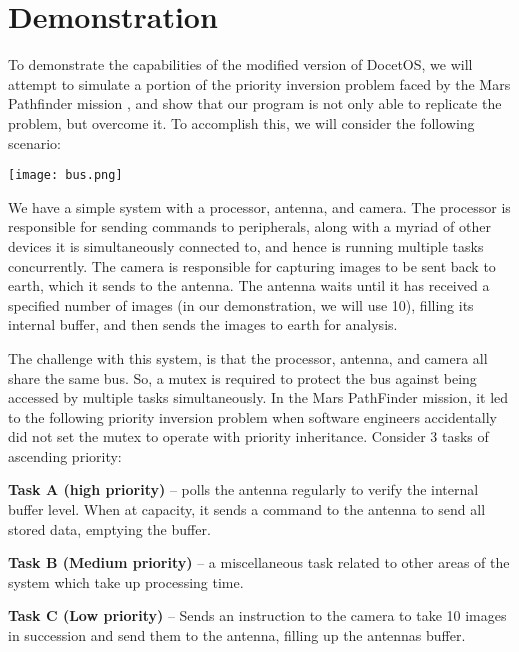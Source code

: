 \section{Demonstration}
To demonstrate the capabilities of the modified version of DocetOS, we will attempt to simulate a portion of the priority inversion problem faced by the Mars Pathfinder mission \cite{MarsPathfinder}, and show that our program is not only able to replicate the problem, but overcome it.\hfill\newline
To accomplish this, we will consider the following scenario:
\begin{center}
	\texttt{[image: bus.png]}
\end{center}
We have a simple system with a processor, antenna, and camera. The processor is responsible for sending commands to peripherals, along with a  myriad of other devices it is simultaneously connected to, and hence is running multiple tasks concurrently. The camera is responsible for capturing images to be sent back to earth, which it sends to the antenna. The antenna waits until it has received a specified number of images (in our demonstration, we will use 10), filling its internal buffer, and then sends the images to earth for analysis.\hfill\newline

The challenge with this system, is that the processor, antenna, and camera all share the same bus. So, a mutex is required to protect the bus against being accessed by multiple tasks simultaneously. In the Mars PathFinder mission, it led to the following priority inversion problem when software engineers accidentally did not set the mutex to operate with priority inheritance. Consider 3 tasks of ascending priority:\hfill\newline

\noindent
\textbf{Task A (high priority)} – polls the antenna regularly to verify the internal buffer level. When at capacity, it sends a command to the antenna to send all stored data, emptying the buffer.\hfill\newline

\noindent
\textbf{Task B (Medium priority)} – a miscellaneous task related to other areas of the system which take up processing time.\hfill\newline

\noindent
\textbf{Task C (Low priority)} – Sends an instruction to the camera to take 10 images in succession and send them to the antenna, filling up the antennas buffer.\hfill\newline

